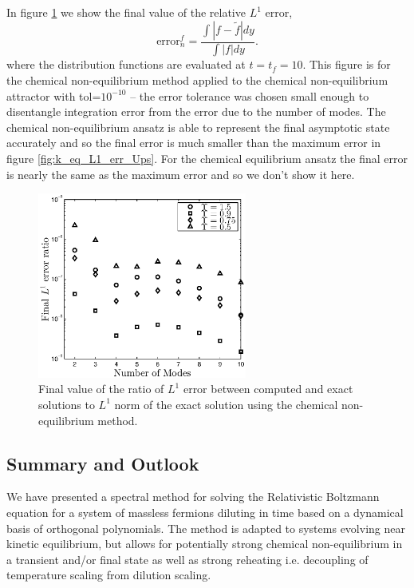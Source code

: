 In figure \ref{fig:k_eq_L1_err_Ups_final} we show the final value of the relative $L^1$ error,
\begin{equation}\label{f_err}
\text{error}_{n}^f= \frac{\int |f-\tilde{f}|dy}{\int |f|dy}.
\end{equation}
where the distribution functions are evaluated at $t=t_f=10$. This figure is for the chemical non-equilibrium method applied to the chemical non-equilibrium attractor with tol=$10^{-10}$ -- the error tolerance was chosen small enough to disentangle integration error from the error due to the number of modes.  The chemical non-equilibrium ansatz is able to represent the final asymptotic state accurately and so the final error is much smaller than the maximum error in figure \ref{fig:k_eq_L1_err_Ups}.  For the chemical equilibrium ansatz the final error is nearly the same as the maximum error and so we don't show it here.

\begin{figure}[H]
\centerline{\includegraphics[height=6.1cm]{03-birrell/SpectralMethodBoltzmann/k_eq_L1_err_Ups_final.eps}}
\caption{Final value of the ratio  of $L^1$ error between computed and exact solutions to $L^1$ norm of the exact solution using the chemical non-equilibrium method.}\label{fig:k_eq_L1_err_Ups_final}
 \end{figure}

\subsection{Summary and Outlook}
We have presented a spectral method for solving the Relativistic Boltzmann equation for a system  of massless fermions  diluting in time based on a dynamical basis of orthogonal polynomials.  The method is adapted to systems evolving near kinetic equilibrium, but allows for potentially strong chemical non-equilibrium in a transient and/or final state as well as strong reheating i.e. decoupling of temperature scaling from dilution scaling.  


